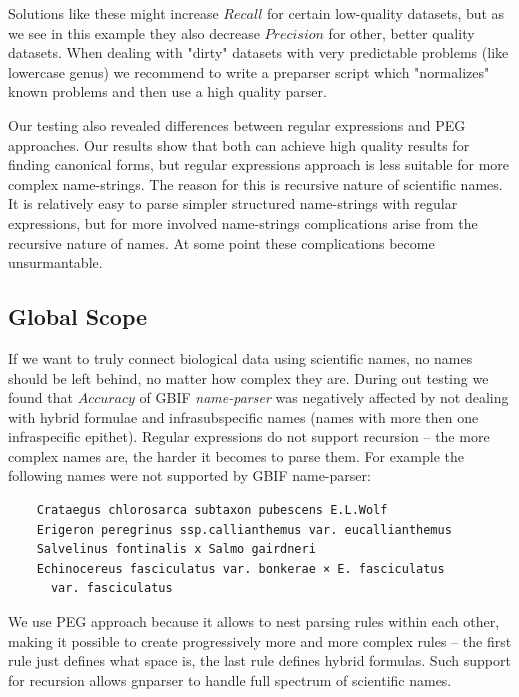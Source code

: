 \documentclass{bmcart}
\begin{document}
Solutions like these might increase $Recall$ for certain low-quality datasets,
but as we see in this example they also decrease $Precision$ for other, better
quality datasets. When dealing with "dirty" datasets with very predictable
problems (like lowercase genus) we recommend to write a preparser script which
"normalizes" known problems and then use a high quality parser.

Our testing also revealed differences between regular expressions and PEG
approaches. Our results show that both can achieve high quality results for
finding canonical forms, but regular expressions approach is less suitable for
more complex name-strings. The reason for this is recursive nature of
scientific names.  It is relatively easy to parse simpler structured
name-strings with regular expressions, but for more involved name-strings
complications arise from the recursive nature of names. At some point these
complications become unsurmantable.

\subsection*{Global Scope}

If we want to truly connect biological data using scientific names, no names
should be left behind, no matter how complex they are. During out testing we
found that $Accuracy$ of GBIF \textit{name-parser} was negatively affected by
not dealing with hybrid formulae and infrasubspecific names (names with more
then one infraspecific epithet). Regular expressions do not support
recursion -- the more complex names are, the harder it becomes to parse them.
For example the following names were not supported by GBIF name-parser:

\vspace{0.5cm}
\begin{verbatim}
    Crataegus chlorosarca subtaxon pubescens E.L.Wolf
    Erigeron peregrinus ssp.callianthemus var. eucallianthemus
    Salvelinus fontinalis x Salmo gairdneri
    Echinocereus fasciculatus var. bonkerae × E. fasciculatus
      var. fasciculatus
\end{verbatim}
\vspace{0.5cm}

We use PEG approach because it allows to nest parsing rules within each other,
making it possible to create progressively more and more complex rules -- the
first rule just defines what space is, the last rule defines hybrid formulas.
Such support for recursion allows gnparser to handle full spectrum of
scientific names.
\end{document}
